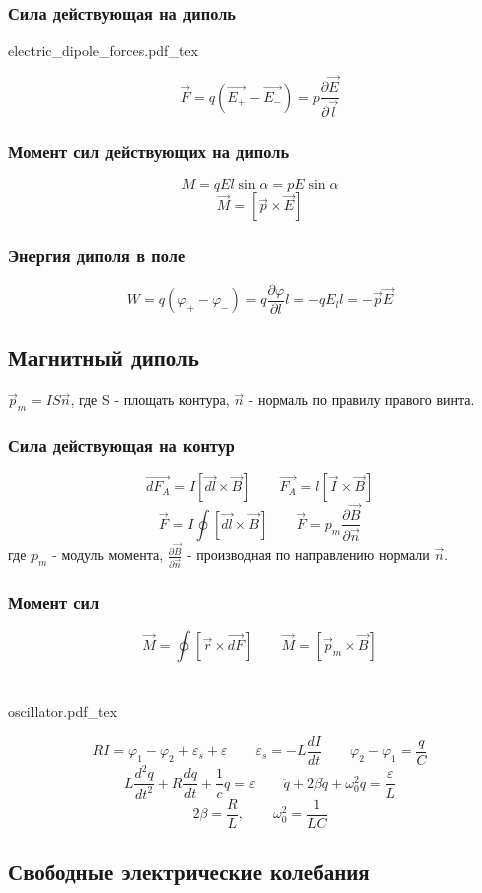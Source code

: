 \documentclass{article}
\newcommand{\incfig}[2][1]{%
    \def\svgwidth{#1\columnwidth}
    {#2.pdf_tex}
}
\begin{document}
\subsubsection{Сила действующая на диполь}
\incfig{electric_dipole_forces}
\[\vec{F}=q(\vec{E_+} - \vec{E_-})=p\frac{\partial\vec{E}}{\partial\vec{l}}\]
\subsubsection{Момент сил действующих на диполь}
\[M=qEl\sin\alpha=pE\sin\alpha\]
\[\vec{M}=[\vec{p}\times\vec{E}]\]
\subsubsection{Энергия диполя в поле}
\[W=q(\varphi_{+}-\varphi_{-})=q\frac{\partial\varphi}{\partial l}l=-qE_{l}l=-\vec{p}\vec{E}\]
\subsection{Магнитный диполь}
$\vec{p}_{m}=IS\vec{n}$, где S - площать контура, $\vec{n}$ - нормаль по правилу правого винта.
\subsubsection{Сила действующая на контур}
\[\vec{dF_A}=I[\vec{dl}\times\vec{B}] \qquad \vec{F_A}=l[\vec{I}\times\vec{B}]\]
\[\vec{F}=I\oint[\vec{dl}\times\vec{B}] \qquad \vec{F}=p_{m}\frac{\partial\vec{B}}{\partial\vec{n}}\]
где $p_{m}$ - модуль момента, $\frac{\partial\vec{B}}{\partial\vec{n}}$ - производная по направлению нормали $\vec{n}$.
\subsubsection{Момент сил}
\[\vec{M}=\oint[\vec{r}\times\vec{dF}] \qquad \vec{M}=[\vec{p}_{m}\times\vec{B}]\]


\section{}
\incfig{oscillator}
\[RI=\varphi_1-\varphi_2+\varepsilon_s+\varepsilon \qquad \varepsilon_s=-L\frac{dI}{dt} \qquad \varphi_2-\varphi_1=\frac{q}{C}\]
\[L\frac{d^2q}{dt^2}+R\frac{dq}{dt} + \frac{1}{c}q = \varepsilon \qquad \ddot{q} + 2\beta\dot{q} + \omega_0^2q = \frac{\varepsilon}{L}\]
\[2\beta = \frac{R}{L}, \qquad \omega_0^2 = \frac{1}{LC} \]
\subsection{Свободные электрические колебания}
\end{document}
